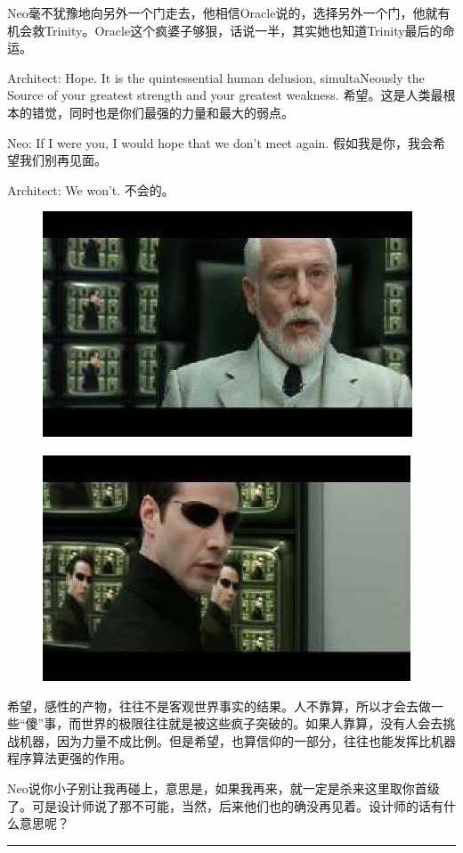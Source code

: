 \documentclass{ctexart}
\newcommand{\myparsep}{\noindent \rule[0.5ex]{\linewidth}{1pt}}
\begin{document}
Neo毫不犹豫地向另外一个门走去，他相信Oracle说的，选择另外一个门，他就有机会救Trinity。Oracle这个疯婆子够狠，话说一半，其实她也知道Trinity最后的命运。

Architect: Hope. It is the quintessential human delusion, simultaNeously the Source of your greatest strength and your greatest weakness. 希望。这是人类最根本的错觉，同时也是你们最强的力量和最大的弱点。

Neo: If I were you, I would hope that we don't meet again. 假如我是你，我会希望我们别再见面。

Architect: We won't. 不会的。

\begin{figure}[htb]
\centering
\includegraphics[width=0.5\linewidth]{fig/read_reloaded-169}
\end{figure}

\begin{figure}[htb]
\centering
\includegraphics[width=0.5\linewidth]{fig/read_reloaded-169-1}
\end{figure}

希望，感性的产物，往往不是客观世界事实的结果。人不靠算，所以才会去做一些“傻”事，而世界的极限往往就是被这些疯子突破的。如果人靠算，没有人会去挑战机器，因为力量不成比例。但是希望，也算信仰的一部分，往往也能发挥比机器程序算法更强的作用。

Neo说你小子别让我再碰上，意思是，如果我再来，就一定是杀来这里取你首级了。可是设计师说了那不可能，当然，后来他们也的确没再见着。设计师的话有什么意思呢？

\myparsep
\end{document}
